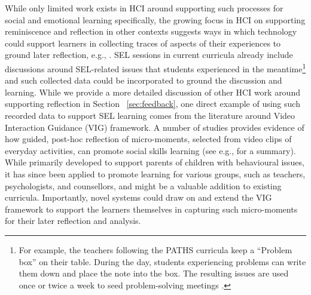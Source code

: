 \documentclass[prodmode,acmtochi]{acmsmall}
\begin{document}
While only limited work exists in HCI around supporting such processes for social and emotional learning specifically, the growing focus in HCI on supporting reminiscence and reflection in other contexts suggests ways in which technology could support learners in collecting traces of aspects of their experiences to ground later reflection, e.g., \cite{Fleck2009,Marcu2012,Sanches2010,McDuff2012}.  
%
SEL sessions in current curricula already include discussions around SEL-related issues that students experienced in the meantime\footnote{For example, the teachers following the PATHS curricula keep a ``Problem box'' on their table. During the day, students experiencing problems can write them down and place the note into the box. The resulting issues are used once or twice a week to seed problem-solving meetings \cite{Kam2004}.} and such collected data could be incorporated to ground the discussion and learning. 
%
While we provide a more detailed discussion of other HCI work around supporting reflection in Section ~\ref{sec:feedback}, one direct example of using such recorded data to support SEL learning comes from the literature around Video Interaction Guidance (VIG) framework. A number of studies provides evidence of how guided, post-hoc reflection of micro-moments, selected from video clips of everyday activities, can promote social skills learning (see e.g., \cite{Kennedy2011} for a summary). While primarily developed to support parents of children with behavioural issues, it has since been applied to promote learning for various groups, such as teachers, psychologists, and counsellors,  and might be a valuable addition to existing curricula. Importantly, novel systems could draw on and extend the VIG framework to support the learners themselves in capturing such micro-moments for their later reflection and analysis.   

%
%
\end{document}
